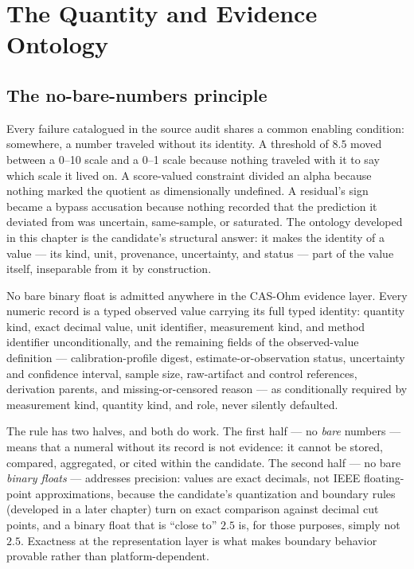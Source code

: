 \chapter{The Quantity and Evidence Ontology}\label{ch03:ontology}

\section{The no-bare-numbers principle}\label{ch03:principle}

Every failure catalogued in the source audit shares a common enabling condition: somewhere, a number traveled without its identity. A threshold of $8.5$ moved between a 0--10 scale and a 0--1 scale because nothing traveled with it to say which scale it lived on. A score-valued constraint divided an alpha because nothing marked the quotient as dimensionally undefined. A residual's sign became a bypass accusation because nothing recorded that the prediction it deviated from was uncertain, same-sample, or saturated. The ontology developed in this chapter is the candidate's structural answer: it makes the identity of a value --- its kind, unit, provenance, uncertainty, and status --- part of the value itself, inseparable from it by construction.

\begin{ruleenv}\label{ch03:rule:nobare}
No bare binary float is admitted anywhere in the CAS-Ohm evidence layer. Every numeric record is a typed observed value carrying its full typed identity: quantity kind, exact decimal value, unit identifier, measurement kind, and method identifier unconditionally, and the remaining fields of the observed-value definition --- calibration-profile digest, estimate-or-observation status, uncertainty and confidence interval, sample size, raw-artifact and control references, derivation parents, and missing-or-censored reason --- as conditionally required by measurement kind, quantity kind, and role, never silently defaulted.
\end{ruleenv}

The rule has two halves, and both do work. The first half --- no \emph{bare} numbers --- means that a numeral without its record is not evidence: it cannot be stored, compared, aggregated, or cited within the candidate. The second half --- no bare \emph{binary floats} --- addresses precision: values are exact decimals, not IEEE floating-point approximations, because the candidate's quantization and boundary rules (developed in a later chapter) turn on exact comparison against decimal cut points, and a binary float that is ``close to'' $2.5$ is, for those purposes, simply not $2.5$. Exactness at the representation layer is what makes boundary behavior provable rather than platform-dependent.

